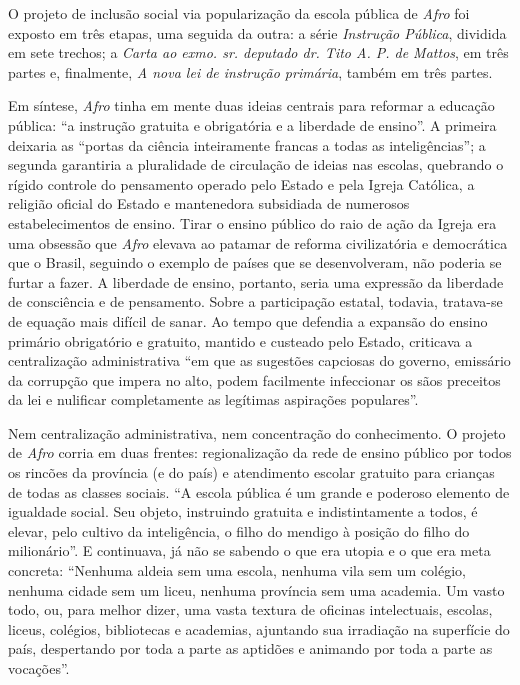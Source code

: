O projeto de inclusão social via popularização da escola pública de
\emph{Afro} foi exposto em três etapas, uma seguida da outra: a série
\emph{Instrução Pública}, dividida em sete trechos; a \emph{Carta ao
exmo. sr. deputado dr. Tito A. P. de Mattos}, em três partes e,
finalmente, \emph{A nova lei de instrução primária}, também em três
partes.

Em síntese, \emph{Afro} tinha em mente duas ideias centrais para
reformar a educação pública: ``a instrução gratuita e obrigatória e a
liberdade de ensino''. A primeira deixaria as ``portas da ciência
inteiramente francas a todas as inteligências''; a segunda garantiria a
pluralidade de circulação de ideias nas escolas, quebrando o rígido
controle do pensamento operado pelo Estado e pela Igreja Católica, a
religião oficial do Estado e mantenedora subsidiada de numerosos
estabelecimentos de ensino. Tirar o ensino público do raio de ação da
Igreja era uma obsessão que \emph{Afro} elevava ao patamar de reforma
civilizatória e democrática que o Brasil, seguindo o exemplo de países
que se desenvolveram, não poderia se furtar a fazer. A liberdade de
ensino, portanto, seria uma expressão da liberdade de consciência e de
pensamento. Sobre a participação estatal, todavia, tratava-se de equação
mais difícil de sanar. Ao tempo que defendia a expansão do ensino
primário obrigatório e gratuito, mantido e custeado pelo Estado,
criticava a centralização administrativa ``em que as sugestões capciosas
do governo, emissário da corrupção que impera no alto, podem facilmente
infeccionar os sãos preceitos da lei e nulificar completamente as
legítimas aspirações populares''.

Nem centralização administrativa, nem concentração do conhecimento. O
projeto de \emph{Afro} corria em duas frentes: regionalização da rede de
ensino público por todos os rincões da província (e do país) e
atendimento escolar gratuito para crianças de todas as classes sociais.
``A escola pública é um grande e poderoso elemento de igualdade social.
Seu objeto, instruindo gratuita e indistintamente a todos, é elevar,
pelo cultivo da inteligência, o filho do mendigo à posição do filho do
milionário''. E continuava, já não se sabendo o que era utopia e o que
era meta concreta: ``Nenhuma aldeia sem uma escola, nenhuma vila sem um
colégio, nenhuma cidade sem um liceu, nenhuma província sem uma
academia. Um vasto todo, ou, para melhor dizer, uma vasta textura de
oficinas intelectuais, escolas, liceus, colégios, bibliotecas e
academias, ajuntando sua irradiação na superfície do país, despertando
por toda a parte as aptidões e animando por toda a parte as vocações''.

